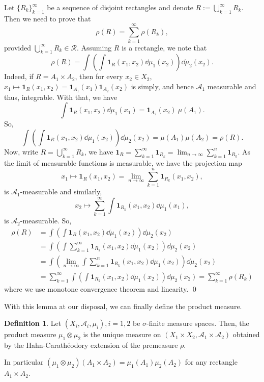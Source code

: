 \documentclass[
]{article}
\theoremstyle{definition}
\theoremstyle{definition}
\newtheorem{definition}{Definition}[section]
\begin{document}
Let \(\{R_k\}_{k = 1}^\infty\) be a sequence of disjoint rectangles and
denote \(R := \bigcup_{k = 1}^\infty R_k\). Then we need to prove that
\[\rho(R) = \sum_{k = 1}^\infty \rho(R_k),\] provided
\(\bigcup_{k = 1}^\infty R_k \in \mathcal{R}\). Assuming \(R\) is a
rectangle, we note that
\[\rho(R) = \int \left(\int \mathbf{1}_R(x_1, x_2) \dd \mu_1(x_2)\right) \dd \mu_2(x_2).\]
Indeed, if \(R = A_1 \times A_2\), then for every \(x_2 \in X_2\),
\(x_1 \mapsto \mathbf{1}_R(x_1, x_2) = \mathbf{1}_{A_1}(x_1) \mathbf{1}_{A_2}(x_2)\)
is simply, and hence \(\mathcal{A_1}\) measurable and thus, integrable.
With that, we have \[\int \mathbf{1}_R(x_1, x_2) \dd \mu_1(x_1) = 
    \mathbf{1}_{A_2}(x_2)\ \mu(A_1).\] So,
\[\int \left(\int \mathbf{1}_R(x_1, x_2) \dd \mu_1(x_2)\right) \dd \mu_2(x_2) = 
    \mu(A_1)\mu(A_2) = \rho(R).\] Now, write
\(R = \bigcup_{k = 1}^\infty R_k\), we have
\(\mathbf{1}_R =  \sum_{k = 1}^\infty \mathbf{1}_{R_k} = \lim_{n \to \infty} \sum_{k = 1}^n \mathbf{1}_{R_k}\).
As the limit of measurable functions is measurable, we have the
projection map
\[x_1 \mapsto \mathbf{1}_R(x_1, x_2) = \lim_{n \to \infty} \sum_{k = 1}^n \mathbf{1}_{R_k}(x_1, x_2),\]
is \(\mathcal{A}_1\)-measurable and similarly,
\[x_2 \mapsto \sum_{k = 1}^\infty \int \mathbf{1}_{R_k}(x_1, x_2) \dd \mu_1(x_1),\]
is \(\mathcal{A}_2\)-measurable. So, \[\begin{split}
    \rho(R) & = \int \left(\int \mathbf{1}_R(x_1, x_2) \dd \mu_1(x_2)\right) \dd \mu_2(x_2)\\
    & = \int \left(\int \sum_{k = 1}^\infty \mathbf{1}_{R_k}(x_1, x_2) \dd \mu_1(x_2)\right) 
      \dd \mu_2(x_2)\\
    & = \int \left(\lim_{n \to \infty} \int \sum_{k = 1}^n 
      \mathbf{1}_{R_k}(x_1, x_2) \dd \mu_1(x_2)\right) \dd \mu_2(x_2)\\
    & = \sum_{k = 1}^\infty \int \left(\int \mathbf{1}_{R_k}(x_1, x_2) \dd \mu_1(x_2)\right) \dd \mu_2(x_2)
    = \sum_{k = 1}^\infty \rho(R_k) \end{split}\] where we use monotone
convergence theorem and linearity. \qed

With this lemma at our disposal, we can finally define the product
measure.

\begin{definition}
  Let \((X_i, \mathcal{A}_i, \mu_i), i = 1, 2\) be \(\sigma\)-finite measure 
  spaces. Then, the product measure \(\mu_1 \otimes \mu_2\) is the unique 
  measure on \((X_1 \times X_2, \mathcal{A}_1 \times \mathcal{A}_2)\) obtained 
  by the Hahn-Carathéodory extension of the premeasure \(\rho\). 

  In particular \((\mu_1 \otimes \mu_2)(A_1 \times A_2) = \mu_1(A_1) \mu_2(A_2)\) 
  for any rectangle \(A_1 \times A_2\).
\end{definition}
\end{document}
